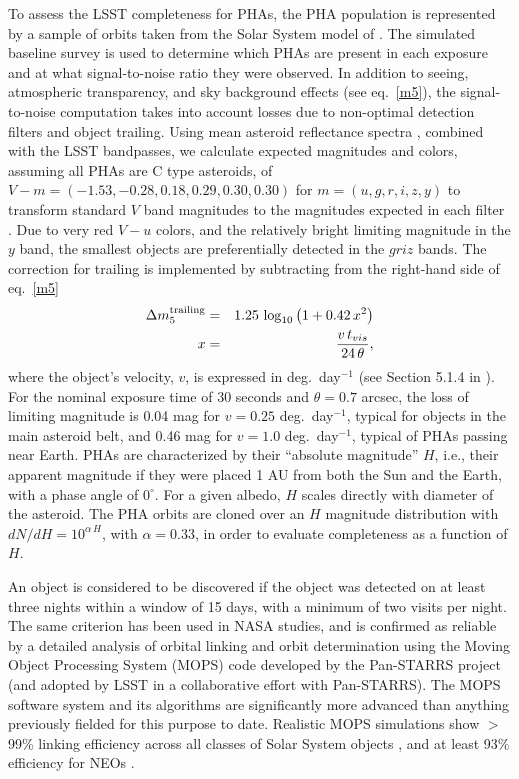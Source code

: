 To assess the LSST completeness for PHAs, the PHA
population is represented by a sample of orbits taken from the Solar
System model of \citet{2007AAS...211.4721G}.
The simulated baseline survey is used to determine which PHAs are present in
each exposure and at what signal-to-noise ratio they were observed. In
addition to  seeing, atmospheric transparency, and sky background effects
(see eq.~\ref{m5}), the signal-to-noise computation takes into account losses
due to non-optimal detection filters and object trailing. Using mean asteroid reflectance
spectra \citep{2009Icar..202..160D}, combined with the LSST bandpasses,
we calculate expected magnitudes and colors, assuming all PHAs are C type asteroids, of
$V-m = (-1.53, -0.28, 0.18, 0.29, 0.30, 0.30)$ for $m=(u, g, r, i, z, y)$ to transform
standard $V$ band magnitudes to the magnitudes expected in each filter \citep{2001AJ....122.2749I}.
Due to very red $V-u$ colors, and the relatively bright limiting magnitude in the $y$
band, the smallest objects are preferentially detected in the $griz$ bands.
The correction for trailing is implemented by subtracting from the right-hand
side of eq.~\ref{m5}
\begin{eqnarray}
 \Delta m_5^\mathrm{trailing} & = &1.25\,\log_{10}\left(1+0.42 \, x^2 \right) \\
   x & = & {v \,t_{vis} \over 24 \, \theta},
\end{eqnarray}
where the object's velocity, $v$, is expressed in deg.~day$^{-1}$ (see Section 5.1.4 in 
\citealt{2018Icar..303..181J}).
For the nominal exposure time of 30 seconds and $\theta=0.7$ arcsec, the loss of limiting
magnitude is 0.04 mag for $v=0.25$ deg.~day$^{-1}$, typical for objects in the main
asteroid belt, and 0.46 mag for $v=1.0$ deg.~day$^{-1}$, typical of PHAs passing
near Earth. PHAs are characterized by their ``absolute magnitude''
$H$, i.e., their apparent magnitude if they were placed 1 AU from
both the Sun and the Earth, with a phase angle of $0^\circ$.  For a
given albedo, $H$ scales directly with diameter of the asteroid.  The PHA
orbits are cloned over an $H$ magnitude distribution with $dN/dH =
10^{\alpha \, H}$,
with $\alpha=0.33$, in order to evaluate completeness as a function of $H$.

An object is considered to be discovered if the object was detected on at least three nights within a
window of 15 days, with a minimum of two visits per night. The same criterion has been used in NASA studies,
and is confirmed as reliable by a detailed analysis of orbital linking and orbit determination using the Moving
Object Processing System (MOPS) code \citep{2017AJ....154...12V,2017AJ....154...13V,2005AAS...20712102J} developed by the
Pan-STARRS project (and adopted by LSST in a collaborative effort with Pan-STARRS). The MOPS software
system and its algorithms are significantly more advanced than anything previously
fielded for this purpose to date. Realistic MOPS simulations show
$>$99\% linking efficiency across all classes of Solar System objects \citep{2013PASP..125..357D},
and at least 93\% efficiency for NEOs \citep{2017AJ....154...12V,2017AJ....154...13V}.

